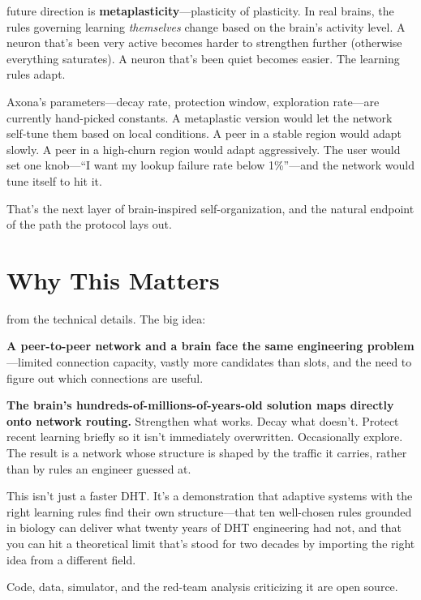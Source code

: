 \documentclass[nobib]{tufte-handout}
\begin{document}
 future direction is \textbf{metaplasticity}---plasticity of plasticity. In real brains, the rules governing learning \emph{themselves} change based on the brain's activity level. A neuron that's been very active becomes harder to strengthen further (otherwise everything saturates). A neuron that's been quiet becomes easier. The learning rules adapt.

Axona's parameters---decay rate, protection window, exploration rate---are currently hand-picked constants. A metaplastic version would let the network self-tune them based on local conditions. A peer in a stable region would adapt slowly. A peer in a high-churn region would adapt aggressively. The user would set one knob---``I want my lookup failure rate below 1\%''---and the network would tune itself to hit it.

That's the next layer of brain-inspired self-organization, and the natural endpoint of the path the protocol lays out.

\section{Why This Matters}

 from the technical details. The big idea:

\textbf{A peer-to-peer network and a brain face the same engineering problem}---limited connection capacity, vastly more candidates than slots, and the need to figure out which connections are useful.

\textbf{The brain's hundreds-of-millions-of-years-old solution maps directly onto network routing.} Strengthen what works. Decay what doesn't. Protect recent learning briefly so it isn't immediately overwritten. Occasionally explore. The result is a network whose structure is shaped by the traffic it carries, rather than by rules an engineer guessed at.

This isn't just a faster DHT. It's a demonstration that adaptive systems with the right learning rules find their own structure---that ten well-chosen rules grounded in biology can deliver what twenty years of DHT engineering had not, and that you can hit a theoretical limit that's stood for two decades by importing the right idea from a different field.

Code, data, simulator, and the red-team analysis criticizing it are open source.
\end{document}
